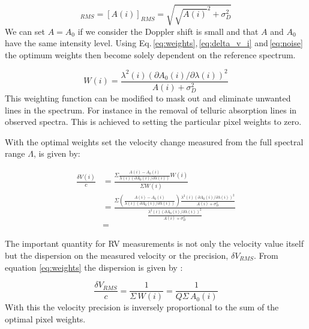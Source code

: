 \begin{equation}
[A(i)-A_0(i)]_{RMS} = [A(i)]_{RMS} = \sqrt{\sqrt{A(i)}^2 + \sigma^2_{D}} \label{eq:noise}
\end{equation}
We can set \(A = A_0\) if we consider the Doppler shift is small and that \(A\) and \(A_0\) have the same intensity level. Using Eq.\,\ref{eq:weights},\,\ref{eq:delta_v_i} and\,\ref{eq:noise}	the optimum weights then become solely dependent on the reference spectrum.



\begin{equation}
W(i) =   \frac{\lambda^2(i)  (\partial A_0(i)/\partial \lambda(i))^{2}}{A(i) + {\sigma}^{2}_{D}} \label{eq:optimal_weight}
\end{equation}
This weighting function can be modified to mask out and eliminate unwanted lines in the spectrum. For instance in the removal of telluric absorption lines in observed spectra. This is achieved to setting the particular pixel weights to zero.

With the optimal weights set the velocity change measured from the full spectral range \(\Lambda\),  is given by:


\begin{eqnarray}
    \frac{\delta V(i)}{c} &= \frac{
    	\Sigma{
        	\frac{
            	A(i) - A_0(i)}{
                \lambda(i) \left(\partial A_0(i)/\partial \lambda(i)\right)} W(i)}}{
             \Sigma {W(i)}} \\
    &= \frac{
    	\Sigma  {
        	(\frac
            	{A(i) - A_0(i)}
                {\lambda(i) (\partial A_0(i)/\partial \lambda(i))}) \frac
                	{\lambda^2(i)  (\partial A_0(i)/\partial \lambda(i))^{2}}
                    {A(i) + {\sigma}^{2}_{D}}
                 }
         }
    {\frac
    	{\lambda^2(i)  (\partial A_0(i)/\partial \lambda(i))^{2}}{A(i) + {\sigma}^{2}_{D}}
        } \\
    &=
    \label{eq:delta_v_eqarray}
\end{eqnarray}

The important quantity for RV measurements is not only the velocity value itself but the dispersion on the measured velocity or the precision, \(\delta V_{RMS}\). From equation \ref{eq:weights} the dispersion is given by :


\begin{equation}
    \frac{\delta V_{RMS}}{c} = \frac{1}{\Sigma {\,W(i)}} = \frac{1}{Q \Sigma {\,A_0(i)}}
\end{equation}
With this the velocity precision is inversely proportional to the sum of the optimal pixel weights.

